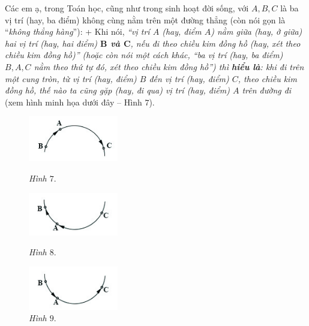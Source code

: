 	\vskip 0.15cm
	Các em ạ, trong Toán học, cũng như trong sinh hoạt đời sống, với $A, B, C$ là ba vị trí (hay, ba điểm) không cùng nằm trên một đường thẳng (còn nói gọn là “\textit{không thẳng hàng}”):
	\vskip 0.15cm
	+ Khi nói, \textit{“vị trí $A$ (\textnormal{hay}, điểm $A$) nằm giữa (\textnormal{hay}, ở giữa) hai vị trí (\textnormal{hay}, hai điểm) \textbf{$\pmb B$ và $\pmb C$}, nếu đi theo chiều kim đồng hồ (\textnormal{hay}, xét theo chiều kim đồng hồ)” (\textnormal{hoặc còn} nói một cách khác, “ba vị trí (\textnormal{hay}, ba điểm) $B, A, C$ nằm theo thứ tự đó, xét theo chiều kim đồng hồ”) thì \textbf{hiểu là}: khi đi trên một cung tròn, từ vị trí (\textnormal{hay}, điểm) $B$ đến vị trí (\textnormal{hay}, điểm) $C$, theo chiều kim đồng hồ, thế nào ta cũng gặp (\textnormal{hay}, đi qua) vị trí (\textnormal{hay}, điểm) $A$ trên đường đi} (xem hình minh họa dưới đây -- Hình $7$).
\vskip 0.1cm
		\begin{figure}
		\vspace*{-15pt}
		\centering
		\captionsetup{labelformat=empty, justification=centering}
		\hspace*{-10pt}\includegraphics[width= 0.35\textwidth]{pic7}
		\caption{\textit{\small Hình $7.$}}
		
		\vspace*{10pt}
		\hspace*{-10pt}\includegraphics[width=0.35\textwidth]{pic8}
		\caption{\small\textit{Hình $8.$}}
		
		\vspace*{10pt}
		\captionsetup{labelformat=empty, justification=centering}
		\hspace*{-10pt}\includegraphics[width= 0.35\textwidth]{pic9}
		\caption{\textit{\small Hình $9.$}}
		
		\vspace*{-20pt}
	\end{figure}
